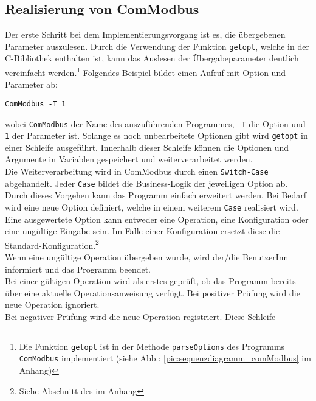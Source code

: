 \documentclass[Bachelorarbeit.tex]{subfiles}
\begin{document}
\subsection{Realisierung von ComModbus}
Der erste Schritt bei dem Implementierungsvorgang ist es, die übergebenen Parameter auszulesen.
Durch die Verwendung der Funktion \texttt{getopt}, welche in der C-Bibliothek enthalten ist, kann das Auslesen der Übergabeparameter deutlich vereinfacht werden.\footnote{Die Funktion \texttt{getopt} ist in der Methode \texttt{parseOptions} des Programms \texttt{ComModbus} implementiert (siehe Abb.: \ref{pic:sequenzdiagramm_comModbus} im Anhang)} 
Folgendes Beispiel bildet einen Aufruf mit Option und Parameter ab:
\begin{verbatim}
ComModbus -T 1
\end{verbatim}
wobei \texttt{ComModbus} der Name des auszuführenden Programmes, \texttt{-T} die Option und 
\texttt{1} der Parameter ist.
Solange es noch unbearbeitete Optionen gibt wird \texttt{getopt} in einer Schleife ausgeführt. 
Innerhalb dieser Schleife können die Optionen und Argumente in Variablen 
gespeichert und weiterverarbeitet werden. \\
Die Weiterverarbeitung wird in ComModbus durch einen \texttt{Switch-Case} abgehandelt. Jeder \texttt{Case} bildet die Business-Logik der jeweiligen Option ab. Durch dieses Vorgehen kann das Programm 
einfach erweitert werden. Bei Bedarf wird eine neue Option definiert, welche in einem 
weiterem \texttt{Case} realisiert wird. \\
Eine ausgewertete Option kann entweder eine Operation, eine 
Konfiguration oder eine ungültige Eingabe sein. Im Falle einer Konfiguration ersetzt 
diese die Standard-Konfiguration.\footnote{Siehe Abschnitt   des  im Anhang} \\
Wenn eine ungültige Operation übergeben wurde, wird der/die BenutzerInn informiert und das Programm beendet. \\
Bei einer gültigen Operation wird als erstes geprüft, ob das Programm bereits über eine aktuelle Operationsanweisung verfügt. Bei positiver Prüfung wird die neue Operation ignoriert.\\ 
Bei negativer Prüfung wird die neue Operation registriert. Diese Schleife  
\end{document}
